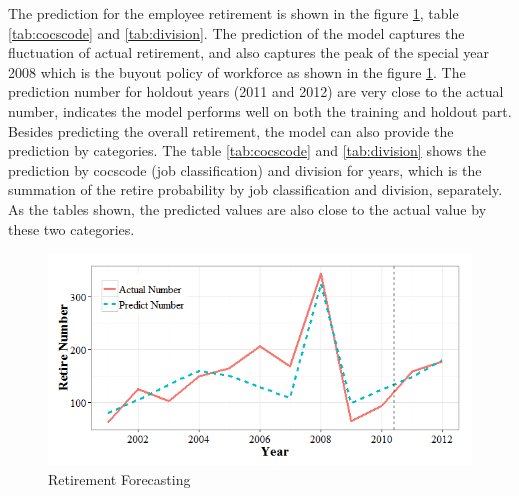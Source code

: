 \documentclass[12pt,letterpaper]{article}
\begin{document}
\begin{enumerate}
The prediction for the employee retirement is shown in the figure \ref{fig:predict}, table \ref{tab:cocscode} and \ref{tab:division}. The prediction of the model captures the fluctuation of actual retirement, and also captures the peak of the special year 2008 which is the buyout policy of workforce as shown in the figure \ref{fig:predict}. The prediction number for holdout years (2011 and 2012) are very close to the actual number, indicates the model performs well on both the training and holdout part. Besides predicting the overall retirement, the model can also provide the prediction by categories. The table \ref{tab:cocscode} and \ref{tab:division} shows the prediction by cocscode (job classification) and division for years, which is the summation of the retire probability by job classification and division, separately. As the tables shown, the predicted values are also close to the actual value by these two categories.
\begin{figure}[h!]
	\centering
	\includegraphics[width=5in]{retire2.png}
	\caption{Retirement Forecasting}
	\label{fig:predict}	
	
\end{figure}


\end{enumerate}
\end{document}
